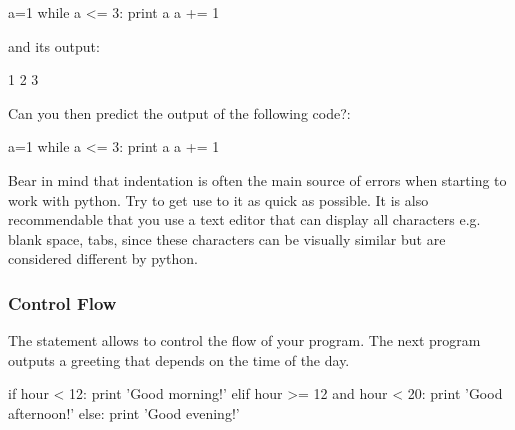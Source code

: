 \begin{python}
a=1
while a <= 3:
    print a
    a += 1
\end{python}

\noindent and its output:

\begin{python}
1
2
3
\end{python}


\begin{exercise}
Can you then predict the output of the following code?:

\begin{python}
a=1
while a <= 3:
    print a
a += 1
\end{python}

\end{exercise}

\noindent Bear in mind that indentation is often the main source of errors when starting to work with python. Try to get use to it as quick as possible. It is also recommendable that you use a text editor that can display all characters e.g. blank space, tabs, since these characters can be visually similar but are considered different by python.



\subsubsection{Control Flow}

The  statement allows to control the flow of your program. The next program outputs a greeting that depends on the time of the day.

\begin{python}
if hour < 12:
    print 'Good morning!'
elif hour >= 12 and hour < 20:
    print 'Good afternoon!'
else:
    print 'Good evening!'
\end{python}

